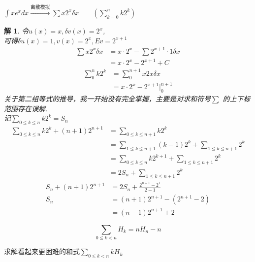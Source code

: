 \documentclass[mode=geye]{elegantnote}
\newtheorem{solve}{解}
\begin{document}
\begin{example}
    $ \int x e^x dx \xrightarrow[]{\text{离散模拟}} \sum x 2^x \delta x \qquad(\sum_{k=0}^{n}k2^k) $ 
\end{example}
\begin{solve}
    令$ u(x)=x, \delta v(x)=2^x $,\\
    可得$ \delta u(x)=1, v(x)=2^x,Ev = 2^{x+1} $  
    \begin{align*}
        \sum x2^x\delta x
        &= x\cdot 2^x - \sum 2^{x+1}\cdot 1\delta x\\
        &= x\cdot 2^x - 2^{x+1}+C
    \end{align*}
    \begin{align*}
        \sum_{0}^{n} k2^k
        &= \sum_{0}^{n+1}x2x\delta x\\
        &= x\cdot 2^x-2^{x+1}\Big|_0^{n+1}
    \end{align*}
    关于第二组等式的推导，我一开始没有完全掌握，主要是对求和符号$ \sum $ 的上下标范围存在误解.\\
    记$ \sum_{0\leqslant k\leqslant n} k 2^k = S_n $ 
    \begin{align*}
        \sum_{0\leqslant k\leqslant n} k 2^k + (n+1)2^{n+1}
        &= \sum_{0\leqslant k\leqslant n+1} k 2^k \\
        &= \sum_{1\leqslant k\leqslant n+1} (k-1) 2^k + \sum_{1\leqslant k\leqslant n+1} 2^k \\
        &= \sum_{0\leqslant k\leqslant n} k 2^{k+1} + \sum_{1\leqslant k\leqslant n+1} 2^k \\
        &= 2S_n + \sum_{1\leqslant k\leqslant n+1} 2^k 
    \end{align*}
    \begin{align*}
        S_n + (n+1)2^{n+1}
        &= 2S_n + \frac{2^{n+1}-2^1}{2-1}\\
        S_n &= (n+1)2^{n+1} - (2^{n+1}-2)\\
        &=(n-1)2^{n+1}+2
    \end{align*}
\end{solve}

\begin{equation}
    \sum_{0\leqslant k< n} H_k =nH_n-n
\end{equation}

求解看起来更困难的和式$ \sum_{0\leqslant k< n} k H_k $ 
\end{document}
